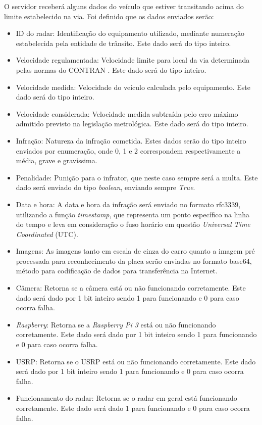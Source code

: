 O servidor receberá alguns dados do veículo que estiver transitando acima do limite estabelecido na via. Foi definido que os dados enviados serão: 

    \begin{itemize}
        \item ID do radar: Identificação do equipamento utilizado, mediante numeração estabelecida pela entidade de trânsito. Este dado será do tipo inteiro.
        \item Velocidade regulamentada: Velocidade limite para  local da via determinada pelas normas do CONTRAN \cite{CONTRAN}. Este dado será do tipo inteiro.
        \item Velocidade medida: Velocidade  do veículo calculada pelo equipamento. Este dado será do tipo inteiro.
        \item Velocidade considerada: Velocidade medida subtraída pelo erro máximo admitido previsto na legislação metrológica. Este dado será do tipo inteiro.
        \item Infração: Natureza da infração cometida. Estes dados serão do tipo inteiro enviados por enumeração, onde 0, 1 e 2 correspondem respectivamente a média, grave e gravíssima.
        \item Penalidade: Punição para o infrator, que neste caso sempre será a multa. Este dado será enviado do tipo \emph{boolean}, enviando sempre \emph{True}.
        \item Data e hora: A data e hora da infração será enviado no formato rfc3339, utilizando a função \emph{timestamp}, que representa um ponto específico na linha do tempo e leva em consideração o fuso horário em questão \emph{Universal Time Coordinated} (UTC). 
        \item Imagens: As imagens tanto em escala de cinza do carro quanto a imagem pré processada para reconhecimento da placa serão enviadas no formato base64, método para codificação de dados para transferência na Internet.
        \item Câmera: Retorna se a câmera está ou não funcionando corretamente. Este dado será dado por 1 bit inteiro sendo 1 para funcionando e 0 para caso ocorra falha.
        \item \emph{Raspberry}: Retorna se a \emph{Raspberry Pi 3} está ou não funcionando corretamente. Este dado será dado por 1 bit inteiro sendo 1 para funcionando e 0 para caso ocorra falha.
        \item USRP: Retorna se o USRP está ou não funcionando corretamente. Este dado será dado por 1 bit inteiro sendo 1 para funcionando e 0 para caso ocorra falha.
        \item Funcionamento do radar: Retorna se o radar em geral está funcionando corretamente. Este dado será dado 1 para funcionando e 0 para caso ocorra falha.
        \end{itemize} 
        
